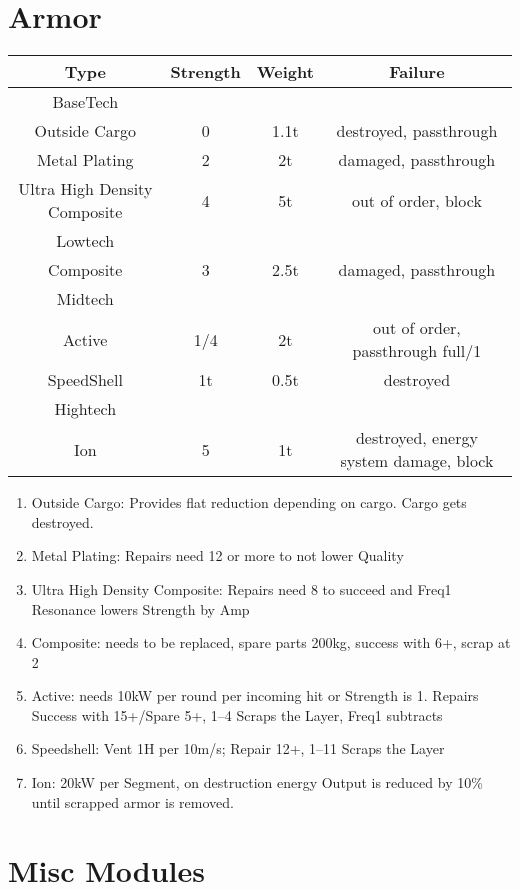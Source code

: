 \section{Armor}\label{sec:armor}
\begin{tabular}{c|ccc}
    Type & Strength & Weight & Failure\\
    \hline BaseTech&&&\\
    Outside Cargo & 0 & 1.1t & destroyed, passthrough\\
    Metal Plating & 2 & 2t & damaged, passthrough\\
    Ultra High Density Composite & 4 & 5t & out of order, block\\
    \hline Lowtech &&&\\
    Composite & 3 & 2.5t & damaged, passthrough \\
    \hline Midtech &&&\\
    Active & 1/4 & 2t & out of order, passthrough full/1\\
    SpeedShell & 1t & 0.5t & destroyed \\
    \hline Hightech &&&\\
    Ion & 5 & 1t & destroyed, energy system damage, block \\
\end{tabular}

\begin{enumerate}[label = - ]
    \item Outside Cargo: Provides flat reduction depending on cargo.
    Cargo gets destroyed.
    \item Metal Plating: Repairs need 12 or more to not lower Quality
    \item Ultra High Density Composite: Repairs need 8 to succeed and Freq1 Resonance lowers Strength by Amp
    \item Composite: needs to be replaced, spare parts 200kg, success with 6+, scrap at 2
    \item Active: needs 10kW per round per incoming hit or Strength is 1.
    Repairs Success with 15+/Spare 5+, 1--4 Scraps the Layer, Freq1 subtracts
    \item Speedshell: Vent 1H per 10m/s;
    Repair 12+, 1--11 Scraps the Layer
    \item Ion: 20kW per Segment, on destruction energy Output is reduced by 10\% until scrapped armor is removed.
\end{enumerate}

\section{Misc Modules}\label{sec:miscmodules}
\par
